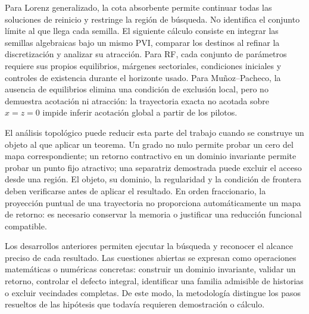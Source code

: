 Para Lorenz generalizado, la cota absorbente permite continuar todas las
soluciones de reinicio y restringe la región de búsqueda. No identifica
el conjunto límite al que llega cada semilla. El siguiente cálculo
consiste en integrar las semillas algebraicas bajo un mismo PVI,
comparar los destinos al refinar la discretización y analizar su
atracción. Para RF, cada conjunto de parámetros requiere sus propios
equilibrios, márgenes sectoriales, condiciones iniciales y controles de
existencia durante el horizonte usado. Para Muñoz--Pacheco, la ausencia
de equilibrios elimina una condición de exclusión local, pero no
demuestra acotación ni atracción: la trayectoria exacta no acotada sobre
$x=z=0$ impide inferir acotación global a partir de los pilotos.

El análisis topológico puede reducir esta parte del trabajo cuando se
construye un objeto al que aplicar un teorema. Un grado no nulo permite
probar un cero del mapa correspondiente; un retorno contractivo en un
dominio invariante permite probar un punto fijo atractivo; una
separatriz demostrada puede excluir el acceso desde una región. El
objeto, su dominio, la regularidad y la condición de frontera deben
verificarse antes de aplicar el resultado. En orden fraccionario, la
proyección puntual de una trayectoria no proporciona automáticamente
un mapa de retorno: es necesario conservar la memoria o justificar una
reducción funcional compatible.

Los desarrollos anteriores permiten ejecutar la búsqueda y reconocer el
alcance preciso de cada resultado. Las cuestiones abiertas se expresan
como operaciones matemáticas o numéricas concretas: construir un
dominio invariante, validar un retorno, controlar el defecto integral,
identificar una familia admisible de historias o excluir vecindades
completas. De este modo, la metodología distingue los pasos resueltos
de las hipótesis que todavía requieren demostración o cálculo.
